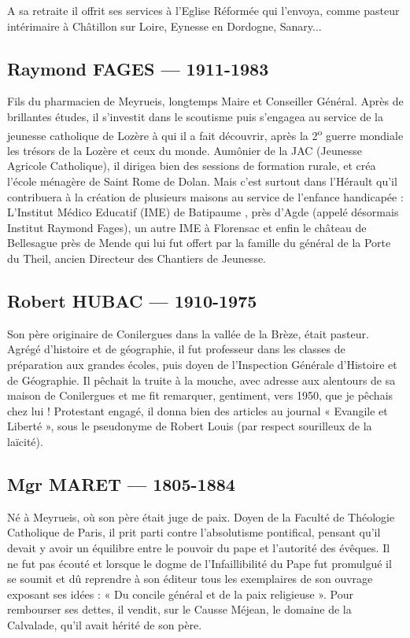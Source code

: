 A sa retraite il offrit ses services à l’Eglise Réformée qui l’envoya, comme pasteur
intérimaire à Châtillon sur Loire, Eynesse en Dordogne, Sanary...

\subsection{Raymond FAGES --- 1911-1983}

Fils du pharmacien de Meyrueis, longtemps Maire et Conseiller Général. Après de
brillantes études, il s’investit dans le scoutisme puis s’engagea au service de la
jeunesse catholique de Lozère à qui il a fait découvrir, après la 2\textsuperscript{o} guerre mondiale
les trésors de la Lozère et ceux du monde.
Aumônier de la JAC (Jeunesse Agricole Catholique), il dirigea bien des sessions de
formation rurale, et créa l’école ménagère de Saint Rome de Dolan. Mais c’est
surtout dans l’Hérault qu’il contribuera à la création de plusieurs maisons au service
de l’enfance handicapée :
L’Institut Médico Educatif (IME) de Batipaume , près d’Agde (appelé désormais
Institut Raymond Fages), un autre IME à Florensac et enfin le château de Bellesague
près de Mende qui lui fut offert par la famille du général de la Porte du Theil, ancien
Directeur des Chantiers de Jeunesse.

\subsection{Robert HUBAC --- 1910-1975}

Son père originaire de Conilergues dans la vallée de la Brèze, était pasteur. Agrégé
d’histoire et de géographie, il fut professeur dans les classes de préparation aux
grandes écoles, puis doyen de l’Inspection Générale d’Histoire et de Géographie.
Il pêchait la truite à la mouche, avec adresse aux alentours de sa maison de
Conilergues et me fit remarquer, gentiment, vers 1950, que je pêchais chez lui !
Protestant engagé, il donna bien des articles au journal « Evangile et Liberté », sous
le pseudonyme de Robert Louis (par respect sourilleux de la laïcité).

\subsection{Mgr MARET --- 1805-1884}

Né à Meyrueis, où son père était juge de paix. Doyen de la Faculté de Théologie
Catholique de Paris, il prit parti contre l’absolutisme pontifical, pensant qu’il devait
y avoir un équilibre entre le pouvoir du pape et l’autorité des évêques.
Il ne fut pas écouté et lorsque le dogme de l’Infaillibilité du Pape fut promulgué il se
soumit et dû reprendre à son éditeur tous les exemplaires de son ouvrage exposant
ses idées : « Du concile général et de la paix religieuse ». Pour rembourser ses
dettes, il vendit, sur le Causse Méjean, le domaine de la Calvalade, qu’il avait hérité
de son père.

